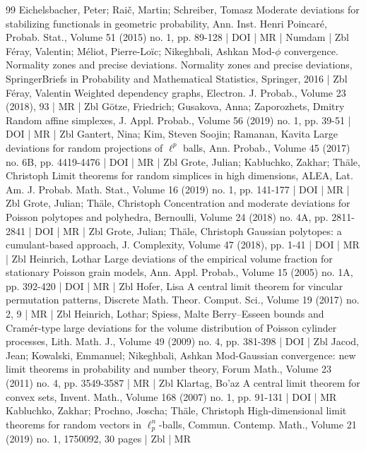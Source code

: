 \begin{thebibliography}{99}
Eichelsbacher, Peter; Raič, Martin; Schreiber, Tomasz Moderate deviations for stabilizing functionals in geometric probability, Ann. Inst. Henri Poincaré, Probab. Stat., Volume 51 (2015) no. 1, pp. 89-128 | DOI | MR | Numdam | Zbl
Féray, Valentin; Méliot, Pierre-Loïc; Nikeghbali, Ashkan Mod-$\phi $ convergence. Normality zones and precise deviations. Normality zones and precise deviations, SpringerBriefs in Probability and Mathematical Statistics, Springer, 2016 | Zbl
Féray, Valentin Weighted dependency graphs, Electron. J. Probab., Volume 23 (2018), 93 | MR | Zbl
Götze, Friedrich; Gusakova, Anna; Zaporozhets, Dmitry Random affine simplexes, J. Appl. Probab., Volume 56 (2019) no. 1, pp. 39-51 | DOI | MR | Zbl
Gantert, Nina; Kim, Steven Soojin; Ramanan, Kavita Large deviations for random projections of $\ell ^p$ balls, Ann. Probab., Volume 45 (2017) no. 6B, pp. 4419-4476 | DOI | MR | Zbl
Grote, Julian; Kabluchko, Zakhar; Thäle, Christoph Limit theorems for random simplices in high dimensions, ALEA, Lat. Am. J. Probab. Math. Stat., Volume 16 (2019) no. 1, pp. 141-177 | DOI | MR | Zbl
Grote, Julian; Thäle, Christoph Concentration and moderate deviations for Poisson polytopes and polyhedra, Bernoulli, Volume 24 (2018) no. 4A, pp. 2811-2841 | DOI | MR | Zbl
Grote, Julian; Thäle, Christoph Gaussian polytopes: a cumulant-based approach, J. Complexity, Volume 47 (2018), pp. 1-41 | DOI | MR | Zbl
Heinrich, Lothar Large deviations of the empirical volume fraction for stationary Poisson grain models, Ann. Appl. Probab., Volume 15 (2005) no. 1A, pp. 392-420 | DOI | MR | Zbl
Hofer, Lisa A central limit theorem for vincular permutation patterns, Discrete Math. Theor. Comput. Sci., Volume 19 (2017) no. 2, 9 | MR | Zbl
Heinrich, Lothar; Spiess, Malte Berry–Esseen bounds and Cramér-type large deviations for the volume distribution of Poisson cylinder processes, Lith. Math. J., Volume 49 (2009) no. 4, pp. 381-398 | DOI | Zbl
Jacod, Jean; Kowalski, Emmanuel; Nikeghbali, Ashkan Mod-Gaussian convergence: new limit theorems in probability and number theory, Forum Math., Volume 23 (2011) no. 4, pp. 3549-3587 | MR | Zbl
Klartag, Bo’az A central limit theorem for convex sets, Invent. Math., Volume 168 (2007) no. 1, pp. 91-131 | DOI | MR
Kabluchko, Zakhar; Prochno, Joscha; Thäle, Christoph High-dimensional limit theorems for random vectors in $\ell _p^n$-balls, Commun. Contemp. Math., Volume 21 (2019) no. 1, 1750092, 30 pages | Zbl | MR

\end{thebibliography}
